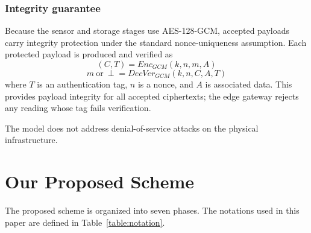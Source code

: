 \documentclass[conference]{IEEEtran}
\begin{document}
    \subsubsection{Integrity guarantee} Because the sensor and storage stages use AES-128-GCM, accepted payloads carry integrity protection under the standard nonce-uniqueness assumption. Each protected payload is produced and verified as
    \begin{equation}
    (C, T) = Enc_{GCM}(k, n, m, A)
    \end{equation}
    \begin{equation}
    m\ \text{or}\ \perp = DecVer_{GCM}(k, n, C, A, T)
    \end{equation}
    where $T$ is an authentication tag, $n$ is a nonce, and $A$ is associated data. This provides payload integrity for all accepted ciphertexts; the edge gateway rejects any reading whose tag fails verification.

    The model does not address denial-of-service attacks on the physical infrastructure.

    \section{Our Proposed Scheme}
    The proposed scheme is organized into seven phases. The notations used in this paper are defined in Table~\ref{table:notation}.
\end{document}
